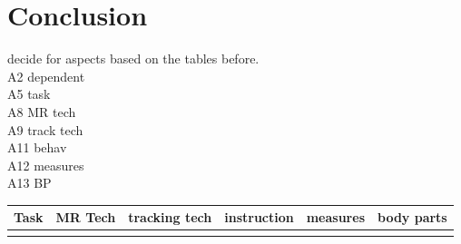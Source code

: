 \section{Conclusion}
decide for aspects based on the tables before. \\
A2 dependent \markAtwoDependent \\
A5 task \markAfiveTask \\
A8 MR tech \markAeightMRtech \\
A9 track tech \markAnineTrackTech \\
A11 behav \markAelevenBehav \\
A12 measures \markAtwelveMeasures \\
A13 BP \markAonethreeBP \\
\begin{table}[]
	\begin{tabular}{|l|l|l|l|l|l|}
		\hline
		Task & MR Tech & tracking tech & instruction & measures & body parts  \\ \hline
		&  &  &  &  &  \\ \hline
	\end{tabular}
\end{table}

